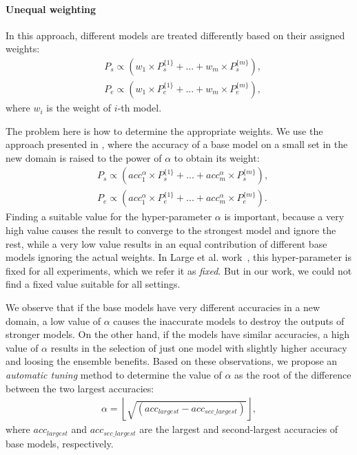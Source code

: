 \documentclass[review]{elsarticle}
\begin{document}
\paragraph{Unequal weighting}
In this approach, different models are treated differently based on their assigned weights:
\begin{equation}\label{eq:weighting1}
\begin{aligned}
&P_{s}\propto(w_{1}\times P^{\{1\}}_{s}+...+w_{m}\times P^{\{m\}}_{s}),\\
&P_{e}\propto(w_{1}\times P^{\{1\}}_{e}+...+w_{m}\times P^{\{m\}}_{e}),
\end{aligned}
\end{equation}
where $w_{i}$ is the weight of $i$-th model.

The problem here is how to determine the appropriate weights. We use the approach presented in \citep{RN261}, where the accuracy of a base model on a small set in the new domain is raised to the power of $\alpha$ to obtain its weight:
\begin{equation}\label{eq:weighting}
    \begin{aligned}
    &P_{s}\propto(acc^{\alpha}_{1}\times P^{\{1\}}_{s}+...+acc^{\alpha}_{m}\times P^{\{m\}}_{s}),\\
    &P_{e}\propto(acc^{\alpha}_{1}\times P^{\{1\}}_{e}+...+acc^{\alpha}_{m}\times P^{\{m\}}_{e}).
    \end{aligned}
\end{equation}
Finding a suitable value for the hyper-parameter $\alpha$ is important, because a very high value causes the result to converge to the strongest model and ignore the rest, while a very low value results in an equal contribution of different base models ignoring the actual weights. In Large et al. work~\citep{RN261}, this hyper-parameter
 is fixed for all experiments, which we refer it as \textit{fixed}. But in our work, we could not find a fixed value suitable for all settings.

We observe that if the base models have very different accuracies in a new domain, a low value of $\alpha$ causes the inaccurate models to destroy the outputs of stronger models. On the other hand, if the models have similar accuracies, a high value of $\alpha$ results in the selection of just one model with slightly higher accuracy and loosing the ensemble benefits. Based on these observations, we propose an \textit{automatic tuning} method to determine the value of $\alpha$ as the root of the difference between the two largest accuracies:
\begin{equation}\label{eq:auto}  
    \begin{aligned}
    \alpha=\left \lfloor{\sqrt{(acc_{largest}-acc_{sec\_largest})}}\right \rfloor,
    \end{aligned}
\end{equation}
where $acc_{largest}$ and $acc_{sec\_largest}$ are the largest and second-largest accuracies of base models, respectively. 
\end{document}
